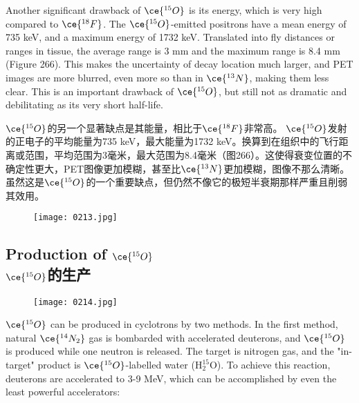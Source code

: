 \documentclass[dvipsnames, svgnames,a4paper,11pt]{article}
\begin{document}
Another significant drawback of \(\ce{^{15}O}\) is its energy, which is very high compared to \(\ce{^{18}F}\). The \(\ce{^{15}O}\)-emitted positrons have a mean energy of 735 keV, and a maximum energy of 1732 keV. Translated into fly distances or ranges in tissue, the average range is 3 mm and the maximum range is 8.4 mm (Figure 266). This makes the uncertainty of decay location much larger, and PET images are more blurred, even more so than in \(\ce{^{13}N}\), making them less clear. This is an important drawback of \(\ce{^{15}O}\), but still not as dramatic and debilitating as its very short half-life.

\(\ce{^{15}O}\)的另一个显著缺点是其能量，相比于\(\ce{^{18}F}\)非常高。 \(\ce{^{15}O}\)发射的正电子的平均能量为735 keV，最大能量为1732 keV。换算到在组织中的飞行距离或范围，平均范围为3毫米，最大范围为8.4毫米（图266）。这使得衰变位置的不确定性更大，PET图像更加模糊，甚至比\(\ce{^{13}N}\)更加模糊，图像不那么清晰。虽然这是\(\ce{^{15}O}\)的一个重要缺点，但仍然不像它的极短半衰期那样严重且削弱其效用。

\begin{figure}[h]
	\centering
    \texttt{[image: 0213.jpg]}  
 \label{fig266}
\end{figure}


\subsection{Production of \(\ce{^{15}O}\)\\ \(\ce{^{15}O}\)的生产}  

\begin{figure}[h]
	\centering
    \texttt{[image: 0214.jpg]}  
     \label{fig267}
\end{figure}

\(\ce{^{15}O}\) can be produced in cyclotrons by two methods. In the first method, natural \(\ce{^{14}N_2}\) gas is bombarded with accelerated deuterons, and \(\ce{^{15}O}\) is produced while one neutron is released. The target is nitrogen gas, and the "in-target" product is \(\ce{^{15}O}\)-labelled water (\(\mathrm{H_2^{15}O}\)). To achieve this reaction, deuterons are accelerated to 3-9 MeV, which can be accomplished by even the least powerful accelerators:
\end{document}
